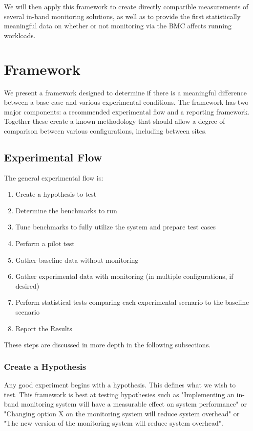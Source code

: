 \documentclass[conference]{IEEEtran}
\begin{document}
We will then apply this framework to create directly comparible measurements of 
several in-band monitoring solutions, as well as to provide the first 
statistically meaningful data on whether or not monitoring via the BMC affects 
running workloads.

\section{Framework} \label{methodology}

We present a framework designed to determine if there is a meaningful difference between 
a base case and various experimental conditions. The framework 
has two major components: a recommended experimental flow and a reporting 
framework. Together these create a known methodology that should allow a degree 
of comparison between various configurations, including between sites.

\subsection{Experimental Flow}

The general
experimental flow is:

\begin{enumerate}
\item Create a hypothesis to test
\item Determine the benchmarks to run
\item Tune benchmarks to fully utilize the system and prepare test cases
\item Perform a pilot test
\item Gather baseline data without monitoring
\item Gather experimental data with monitoring (in multiple configurations, if desired)
\item Perform statistical tests comparing each experimental scenario to the 
baseline scenario
\item Report the Results
\end{enumerate}

These steps are discussed in more depth in the following subsections.

\subsubsection{Create a Hypothesis}

Any good experiment begins with a hypothesis. This defines what we wish to test.
This framework is best at testing hypothesies such as "Implementing an in-band 
monitoring system will have a measurable effect on system performance" or 
"Changing option X on the monitoring system will reduce system overhead" or 
"The new version of the monitoring system will reduce system overhead".
\end{document}
